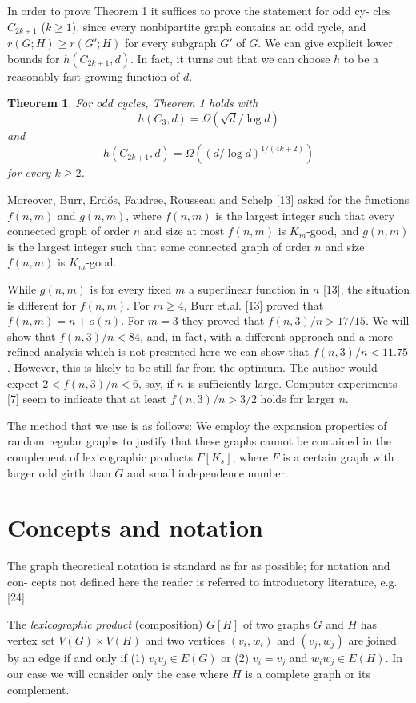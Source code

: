 \documentclass[12pt,a4paper]{article}
\newtheorem{theorem}{Theorem}
\begin{document}
In order to prove Theorem 1 it suffices to prove the statement for odd cy-
cles $C_{2k+1}$ ($k\ge 1$), since every nonbipartite graph contains an odd cycle, and
$r(G;H)\ge r(G';H)$ for every subgraph $G'$ of $G$. We can give explicit lower bounds
for $h(C_{2k+1},d)$. In fact, it turns out that we can choose $h$ to be a reasonably fast
growing function of $d$.

\begin{theorem}
For odd cycles, Theorem 1 holds with
\[
  h(C_3,d)=\Omega(\sqrt{d}/\log d)
\]
and
\[
  h(C_{2k+1},d)=\Omega((d/\log d)^{1/(4k+2)})
\]
for every $k\ge 2$.
\end{theorem}

Moreover, Burr, Erd\H{o}s, Faudree, Rousseau and Schelp [13] asked for the functions
$f(n,m)$ and $g(n,m)$, where $f(n,m)$ is the largest integer such that every connected
graph of order $n$ and size at most $f(n,m)$ is $K_m$-good, and $g(n,m)$ is the largest
integer such that some connected graph of order $n$ and size $f(n,m)$ is $K_m$-good.

While $g(n,m)$ is for every fixed $m$ a superlinear function in $n$ [13], the situation is
different for $f(n,m)$. For $m\ge 4$, Burr et.al. [13] proved that $f(n,m)=n+o(n)$. For
$m=3$ they proved that $f(n,3)/n>17/15$. We will show that $f(n,3)/n<84$, and,
in fact, with a different approach and a more refined analysis which is not presented
here we can show that $f(n,3)/n<11.75$. However, this is likely to be still far from
the optimum. The author would expect $2<f(n,3)/n<6$, say, if $n$ is sufficiently
large. Computer experiments [7] seem to indicate that at least $f(n,3)/n>3/2$
holds for larger $n$.

The method that we use is as follows: We employ the expansion properties
of random regular graphs to justify that these graphs cannot be contained in the
complement of lexicographic products $F[K_s]$, where $F$ is a certain graph with larger
odd girth than $G$ and small independence number.

\section{Concepts and notation}

The graph theoretical notation is standard as far as possible; for notation and con-
cepts not defined here the reader is referred to introductory literature, e.g. [24].

The \emph{lexicographic product} (composition) $G[H]$ of two graphs $G$ and $H$ has vertex
set $V(G)\times V(H)$ and two vertices $(v_i,w_i)$ and $(v_j,w_j)$ are joined by an edge if and
only if (1) $v_iv_j\in E(G)$ or (2) $v_i=v_j$ and $w_iw_j\in E(H)$. In our case we will consider
only the case where $H$ is a complete graph or its complement.
\end{document}
